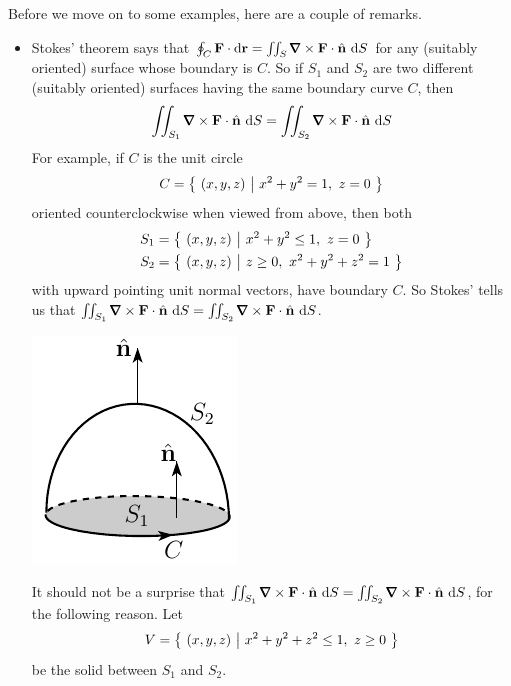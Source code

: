Before we move on to some examples, here are a couple of remarks.

\begin{itemize}
\item
Stokes' theorem says that 
$\oint_{C}\vF\cdot \dee{\vr}
  =\dblInt_{S}\vnabla\times\vF\cdot\hn\ \dee{S}$
for any (suitably oriented) surface whose boundary is $C$. So if
$S_1$ and $S_2$ are two different (suitably oriented) surfaces having the 
same boundary curve $C$, then
\begin{equation*}
\dblInt_{S_1}\vnabla\times\vF\cdot\hn\ \dee{S}
=\dblInt_{S_2}\vnabla\times\vF\cdot\hn\ \dee{S}
\end{equation*}
For example, if $C$ is the unit circle
\begin{equation*}
C=\big\{ \ (x,y,z)\ \big|\ x^2+y^2=1,\ z=0\ \big\}
\end{equation*}
oriented counterclockwise when viewed from above, then both
\begin{align*}
S_1&= \big\{ \ (x,y,z)\ \big|\ x^2+y^2\le 1,\ z=0\ \big\} \\
S_2&= \big\{ \ (x,y,z)\ \big|\ z\ge0,\ x^2+y^2+z^2=1\ \big\} 
\end{align*}
with upward pointing unit normal vectors, have boundary $C$. So Stokes'
tells us that $\dblInt_{S_1}\vnabla\times\vF\cdot\hn\ \dee{S}
=\dblInt_{S_2}\vnabla\times\vF\cdot\hn\ \dee{S}$.
\begin{nfig}
\begin{center}
    \includegraphics{twoSurfaceA.pdf}
\end{center}
\end{nfig}
It should not be a surprise that $\dblInt_{S_1}\vnabla\times\vF\cdot\hn\ \dee{S}
=\dblInt_{S_2}\vnabla\times\vF\cdot\hn\ \dee{S}$, for the following reason.
Let 
\begin{equation*}
V= \big\{ \ (x,y,z)\ \big|\ x^2+y^2+z^2\le 1,\ z\ge 0\ \big\} \\
\end{equation*}
be the solid between $S_1$ and $S_2$.

\end{itemize}
